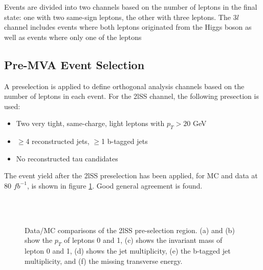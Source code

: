 Events are divided into two channels based on the number of leptons in the final state: one with two same-sign leptons, the other with three leptons. The $3l$ channel includes events where both leptons originated from the Higgs boson as well as events where only one of the leptons 


\subsection{Pre-MVA Event Selection}
\label{subsec:preMVA}

A preselection is applied to define orthogonal analysis channels based on the number of leptons in each event. For the 2lSS channel, the following presection is used:

\begin{itemize}
  \item Two very tight, same-charge, light leptons with $p_T > 20$ GeV
  \item $\geq$4 reconstructed jets, $\geq$1 b-tagged jets
  \item No reconstructed tau candidates
\end{itemize}

The event yield after the 2lSS preselection has been applied, for MC and data at 80 $fb^{-1}$, is shown in figure \ref{fig:presel2lSS}. Good general agreement is found.

\begin{figure}[h!]
    \\
    \\
    \caption{Data/MC comparisons of the 2lSS pre-selection region. (a) and (b) show the $p_T$ of leptons 0 and 1, (c) shows the invariant mass of lepton 0 and 1, (d) shows the jet multiplicity, (e) the b-tagged jet multiplicity, and (f) the missing transverse energy.}                           
    \label{fig:presel2lSS}
\end{figure}


